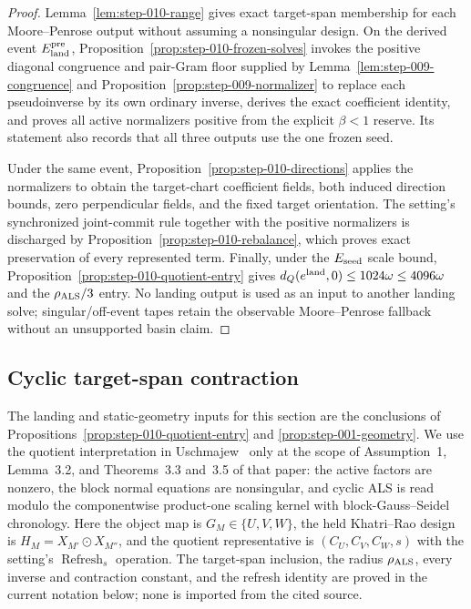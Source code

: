 \begin{proof}
Lemma~\ref{lem:step-010-range} gives exact target-span membership for each
Moore--Penrose output without assuming a nonsingular design.  On the derived
event \(E_{\rm land}^{\rm pre}\), Proposition~\ref{prop:step-010-frozen-solves}
invokes the positive diagonal congruence and pair-Gram floor supplied by
Lemma~\ref{lem:step-009-congruence} and
Proposition~\ref{prop:step-009-normalizer} to replace each pseudoinverse by
its own ordinary inverse, derives the exact coefficient identity, and proves
all active normalizers positive from the explicit \(\beta<1\) reserve.  Its
statement also records that all three outputs use the one frozen seed.

Under the same event, Proposition~\ref{prop:step-010-directions} applies the
normalizers to obtain the target-chart coefficient fields, both induced
direction bounds, zero perpendicular fields, and the fixed target
orientation.  The setting's synchronized joint-commit rule together with the
positive normalizers is discharged by
Proposition~\ref{prop:step-010-rebalance}, which proves exact preservation of
every represented term.  Finally, under the \(E_{\rm seed}\) scale
bound, Proposition~\ref{prop:step-010-quotient-entry} gives
\(d_Q(e^{\rm land},0)\le1024\omega\le4096\omega\) and the
\(\rho_{\rm ALS}/3\) entry.  No landing output is used as an input to another
landing solve; singular/off-event tapes retain the observable
Moore--Penrose fallback without an unsupported basin claim.
\end{proof}

\subsection{Cyclic target-span contraction}\label{app:step-011}

The landing and static-geometry inputs for this section are the conclusions of
Propositions~\ref{prop:step-010-quotient-entry} and
\ref{prop:step-001-geometry}.  We use the quotient interpretation in
Uschmajew~\cite{Uschmajew2012} only at the scope of Assumption~1, Lemma~3.2,
and Theorems~3.3 and~3.5 of that paper: the active factors are nonzero, the
block normal equations are nonsingular, and cyclic ALS is read modulo the
componentwise product-one scaling kernel with block-Gauss--Seidel chronology.
Here the object map is $G_M\in\{U,V,W\}$, the held Khatri--Rao design is
$H_M=X_{M'}\odot X_{M''}$, and the quotient representative is
$(C_U,C_V,C_W,s)$ with the setting's $\operatorname{Refresh}_s$ operation.
The target-span inclusion, the radius $\rho_{\rm ALS}$, every inverse and
contraction constant, and the refresh identity are proved in the current
notation below; none is imported from the cited source.

